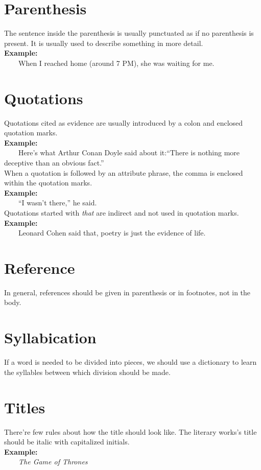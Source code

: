 \documentclass[12pt]{report}
\newcommand{\xmpl}{\textbf{Example:}\\} %
\newcommand{\indnt}{\ \ \ \ } %
\begin{document}
\section{Parenthesis}
The sentence inside the parenthesis is usually punctuated as if no parenthesis is present. It is usually used to describe something in more detail.\\
\xmpl
\indnt When I reached home (around 7 PM), she was waiting for me.
\section{Quotations}
Quotations cited as evidence are usually introduced by a colon and enclosed quotation marks.\\
\xmpl
\indnt Here's what Arthur Conan Doyle said about it:``There is nothing more deceptive than an obvious fact.''\\
When a quotation is followed by an attribute phrase, the comma is enclosed within the quotation marks.\\
\xmpl
\indnt ``I wasn't there,'' he said.\\
Quotations started with \textit{that} are indirect and not used in quotation marks.\\
\xmpl
\indnt Leonard Cohen said that, poetry is just the evidence of life.\\
\section{Reference}
In general, references should be given in parenthesis or in footnotes, not in the body.
\section{Syllabication}
If a word is needed to be divided into pieces, we should use a dictionary to learn the syllables between which division should be made.
\section{Titles}
There're few rules about how the title should look like. The literary works's title should be italic with capitalized initials.\\
\xmpl
\indnt \textit{The Game of Thrones}
\end{document}
